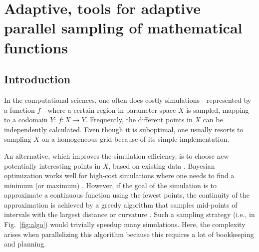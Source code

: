 \chapter{Adaptive, tools for adaptive parallel sampling of mathematical functions}
\label{ch:adaptive}

\newpage
\noindent

\section{Introduction}


In the computational sciences, one often does costly simulations---represented by a function $f$---where a certain region in parameter space $X$ is sampled, mapping to a codomain $Y$: $f \colon X \to Y$.
Frequently, the different points in $X$ can be independently calculated.
Even though it is suboptimal, one usually resorts to sampling $X$ on a homogeneous grid because of its simple implementation.


An alternative, which improves the simulation efficiency, is to choose new potentially interesting points in $X$, based on existing data \cite{Gramacy2004, Figueiredo1995, Castro2008, Chen2017}.
Bayesian optimization works well for high-cost simulations where one needs to find a minimum (or maximum) \cite{Takhtaganov2018}.
However, if the goal of the simulation is to approximate a continuous function using the fewest points, the continuity of the approximation is achieved by a greedy algorithm that samples mid-points of intervals with the largest distance or curvature \cite{Wolfram2011}.
Such a sampling strategy (i.e., in Fig.~\ref{fig:algo}) would trivially speedup many simulations.
Here, the complexity arises when parallelizing this algorithm because this requires a lot of bookkeeping and planning.

